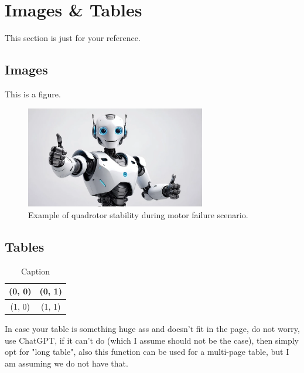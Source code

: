     \section{Images \& Tables}
    This section is just for your reference.
    \subsection{Images}
    This is a figure.\\
    \begin{figure}[h!]      %
        \centering
        \includegraphics[width=0.7\textwidth]{images/example_image.jpg}
        \caption{Example of quadrotor stability during motor failure scenario.}
        \label{fig:example image}
    \end{figure}
    
    \subsection{Tables}
    \begin{table}[h]
        \centering
        \begin{tabular}{|c|c|}      %
            \hline      %
            (0, 0) & (0, 1)\\
            \hline
            (1, 0) & (1, 1) \\
            \hline
        \end{tabular}
        \caption{Caption}
        \label{tab:my_label}
    \end{table}

    In case your table is something huge ass and doesn't fit in the page, do not worry, use ChatGPT, if it can't do (which I assume should not be the case), then simply opt for "long table", also this function can be used for a multi-page table, but I am assuming we do not have that.